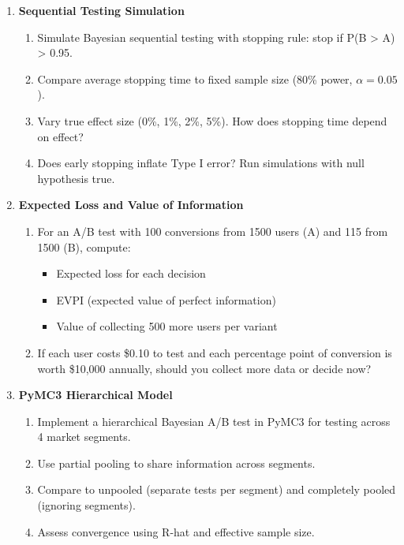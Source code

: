 \begin{enumerate}
    \item \textbf{Sequential Testing Simulation}
    \begin{enumerate}
        \item Simulate Bayesian sequential testing with stopping rule: stop if P(B > A) > 0.95.
        \item Compare average stopping time to fixed sample size (80\% power, $\alpha = 0.05$).
        \item Vary true effect size (0\%, 1\%, 2\%, 5\%). How does stopping time depend on effect?
        \item Does early stopping inflate Type I error? Run simulations with null hypothesis true.
    \end{enumerate}

    \item \textbf{Expected Loss and Value of Information}
    \begin{enumerate}
        \item For an A/B test with 100 conversions from 1500 users (A) and 115 from 1500 (B), compute:
        \begin{itemize}
            \item Expected loss for each decision
            \item EVPI (expected value of perfect information)
            \item Value of collecting 500 more users per variant
        \end{itemize}
        \item If each user costs \$0.10 to test and each percentage point of conversion is worth \$10,000 annually, should you collect more data or decide now?
    \end{enumerate}

    \item \textbf{PyMC3 Hierarchical Model}
    \begin{enumerate}
        \item Implement a hierarchical Bayesian A/B test in PyMC3 for testing across 4 market segments.
        \item Use partial pooling to share information across segments.
        \item Compare to unpooled (separate tests per segment) and completely pooled (ignoring segments).
        \item Assess convergence using R-hat and effective sample size.
    \end{enumerate}


\end{enumerate}
